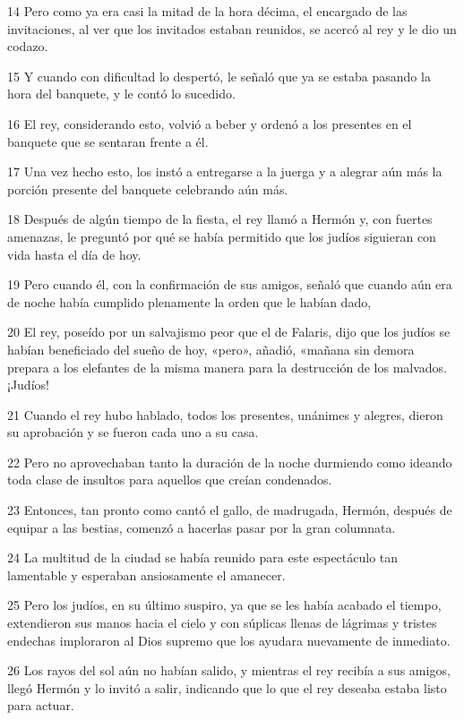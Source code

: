 \par 14 Pero como ya era casi la mitad de la hora décima, el encargado de las invitaciones, al ver que los invitados estaban reunidos, se acercó al rey y le dio un codazo.
\par 15 Y cuando con dificultad lo despertó, le señaló que ya se estaba pasando la hora del banquete, y le contó lo sucedido.
\par 16 El rey, considerando esto, volvió a beber y ordenó a los presentes en el banquete que se sentaran frente a él.
\par 17 Una vez hecho esto, los instó a entregarse a la juerga y a alegrar aún más la porción presente del banquete celebrando aún más.
\par 18 Después de algún tiempo de la fiesta, el rey llamó a Hermón y, con fuertes amenazas, le preguntó por qué se había permitido que los judíos siguieran con vida hasta el día de hoy.
\par 19 Pero cuando él, con la confirmación de sus amigos, señaló que cuando aún era de noche había cumplido plenamente la orden que le habían dado,
\par 20 El rey, poseído por un salvajismo peor que el de Falaris, dijo que los judíos se habían beneficiado del sueño de hoy, «pero», añadió, «mañana sin demora prepara a los elefantes de la misma manera para la destrucción de los malvados. ¡Judíos!
\par 21 Cuando el rey hubo hablado, todos los presentes, unánimes y alegres, dieron su aprobación y se fueron cada uno a su casa.
\par 22 Pero no aprovechaban tanto la duración de la noche durmiendo como ideando toda clase de insultos para aquellos que creían condenados.
\par 23 Entonces, tan pronto como cantó el gallo, de madrugada, Hermón, después de equipar a las bestias, comenzó a hacerlas pasar por la gran columnata.
\par 24 La multitud de la ciudad se había reunido para este espectáculo tan lamentable y esperaban ansiosamente el amanecer.
\par 25 Pero los judíos, en su último suspiro, ya que se les había acabado el tiempo, extendieron sus manos hacia el cielo y con súplicas llenas de lágrimas y tristes endechas imploraron al Dios supremo que los ayudara nuevamente de inmediato.
\par 26 Los rayos del sol aún no habían salido, y mientras el rey recibía a sus amigos, llegó Hermón y lo invitó a salir, indicando que lo que el rey deseaba estaba listo para actuar.
